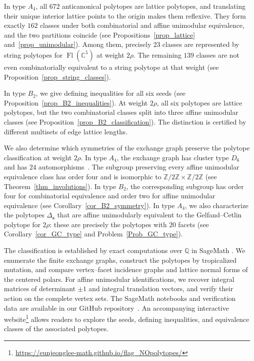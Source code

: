 \documentclass[10pt]{amsart}
\numberwithin{equation}{section}
\newcommand{\C}{{\mathbb{C}}}
\DeclareMathOperator{\flag}{Fl}
\theoremstyle{plain}
\theoremstyle{definition}
\theoremstyle{remark}
\begin{document}
In type $A_4$, all $672$ anticanonical polytopes are lattice
polytopes, and translating their unique interior lattice
points to the origin makes them reflexive.
They form exactly $162$ classes under both combinatorial
and affine unimodular equivalence, and the two partitions
coincide (see Propositions~\ref{prop_lattice}
and~\ref{prop_unimodular}).
Among them, precisely $23$ classes are represented by string
polytopes for $\flag(\C^5)$ at weight $2\rho$.
The remaining $139$ classes are not even combinatorially
equivalent to a string polytope at that weight
(see Proposition~\ref{prop_string_classes}).

In type $B_2$, we give defining inequalities for all six
seeds (see Proposition~\ref{prop_B2_inequalities}).
At weight $2\rho$, all six polytopes are lattice polytopes,
but the two combinatorial classes split into three
affine unimodular classes
(see Proposition~\ref{prop_B2_classification}). 
The distinction is certified by different multisets of
edge lattice lengths.

We also determine which symmetries of the exchange graph
preserve the polytope classification at weight $2\rho$.
In type $A_4$, the exchange graph has cluster type $D_6$
and has $24$ automorphisms~\cite{CZ16finite,CZ20exchange}.
The subgroup preserving every affine unimodular equivalence
class has order four and is isomorphic to
$\mathbb Z/2\mathbb Z\times\mathbb Z/2\mathbb Z$
(see Theorem~\ref{thm_involutions}).
In type $B_2$, the corresponding subgroup has order four for
combinatorial equivalence and order two for affine unimodular
equivalence (see Corollary~\ref{cor_B2_symmetry}).
In type $A_4$, we also characterize the polytopes
$\Delta_{\bm s}$ that are affine unimodularly equivalent
to the Gelfand--Cetlin polytope for $2\rho$:
these are precisely the polytopes with $20$ facets
(see Corollary~\ref{cor_GC_type} and Problem~\ref{Prob_GC_type}).

\medskip 

The classification is established by exact computations
over $\mathbb Q$ in SageMath \cite{sagemath}.
We enumerate the finite exchange graphs, construct the
polytopes by tropicalized mutation, and compare
vertex--facet incidence graphs and lattice normal forms
of the centered polars.
For affine unimodular identifications, we recover
integral matrices of determinant $\pm1$ and integral
translation vectors, and verify their action on the
complete vertex sets.
The SageMath notebooks and verification data are available
in our GitHub repository~\cite{github}.
An accompanying interactive website\footnote{\url{https://eunjeonglee-math.github.io/flag_NOpolytopes/}}
allows readers to explore the seeds, defining inequalities,
and equivalence classes of the associated polytopes.
\end{document}
